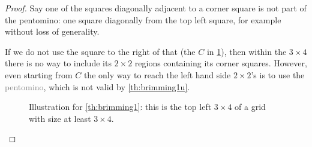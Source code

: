 \documentclass{article}
\newcommand{\pentU}{\smash{\colorbox{colorU!50}{U}}}
\theoremstyle{definition}%
\newcommand{\minordetail}[1]{\textcolor{gray}{#1}}
\begin{document}
\begin{proof}
Say one of the squares diagonally adjacent to a corner square is not part of the pentomino: one square diagonally from the top left square, for example without loss of generality.

If we do not use the square to the right of that (the $C$ in \cref{fig:brimming1}), then within the $3 \times 4$ there is no way to include its $2 \times 2$ regions containing its corner squares. However, even starting from $C$ the only way to reach the left hand side $2 \times 2$'s is to use the \pentU{} \minordetail{pentomino}, which is not valid by \cref{th:brimming1u}.
\begin{figure}
    \centering
    \caption{Illustration for \cref{th:brimming1}: this is the top left $3 \times 4$ of a grid with size at least $3 \times 4$.}
    \label{fig:brimming1}
\end{figure}
\end{proof}
\end{document}
